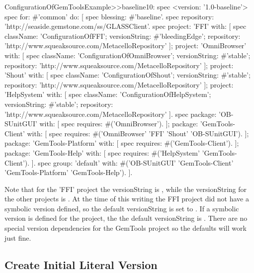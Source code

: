 \documentclass[a4paper,10pt,twoside]{book}
\begin{document}
\begin{code}{}
ConfigurationOfGemToolsExample>>baseline10: spec
  <version: '1.0-baseline'>
  spec for: #'common' do: [
     spec blessing: #'baseline'.
     spec repository: 'http://seaside.gemstone.com/ss/GLASSClient'.
     spec
        project: 'FFI' with: [
          spec
             className: 'ConfigurationOfFFI';
             versionString: #'bleedingEdge';
             repository: 'http://www.squeaksource.com/MetacelloRepository' ];
        project: 'OmniBrowser' with: [
          spec
             className: 'ConfigurationOfOmniBrowser';
             versionString: #'stable';
             repository: 'http://www.squeaksource.com/MetacelloRepository' ];
        project: 'Shout' with: [
          spec
             className: 'ConfigurationOfShout';
             versionString: #'stable';
             repository: 'http://www.squeaksource.com/MetacelloRepository' ];
        project: 'HelpSystem' with: [
          spec
             className: 'ConfigurationOfHelpSystem';
             versionString: #'stable';
             repository: 'http://www.squeaksource.com/MetacelloRepository' ].
     spec
        package: 'OB-SUnitGUI' with: [
          spec requires: #('OmniBrowser'). ];
        package: 'GemTools-Client' with: [
          spec requires: #('OmniBrowser' 'FFI' 'Shout' 'OB-SUnitGUI'). ];
        package: 'GemTools-Platform' with: [
          spec requires: #('GemTools-Client'). ];
        package: 'GemTools-Help' with: [
          spec requires: #('HelpSystem' 'GemTools-Client'). ].
     spec group: 'default' with: #('OB-SUnitGUI' 'GemTools-Client'
             'GemTools-Platform' 'GemTools-Help'). ].
\end{code}             



Note that for the 'FFI' project the versionString is , while the versionString for the other projects is . At the time of this writing the FFI project did not have a  symbolic version defined, so the default versionString is set to . If a  symbolic version is defined for the project, the the default versionString is . There are no special version dependencies for the GemTools project so the defaults will work just fine.



\subsection{Create Initial Literal Version}
\end{document}
